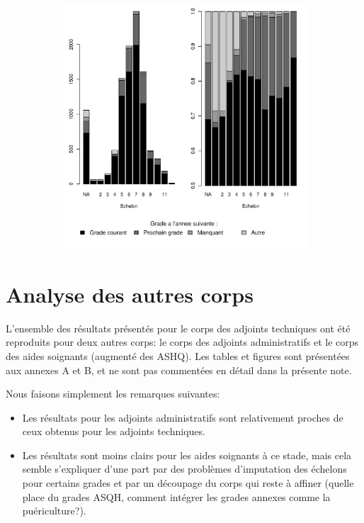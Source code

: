 \documentclass[11pt,a4paper]{article}
\begin{document}
\begin{figure}[ht]
\begin{subfigure}[b]{0.5\linewidth}
    \label{evo_by_ech_794} 
    \centering
    \includegraphics[width=1\linewidth]{AT_hazard_by_ech_794.pdf} 
  \end{subfigure} 
\end{figure}


\section{Analyse des autres corps}

L'ensemble des résultats présentés pour le corps des adjoints techniques ont été reproduits pour deux autres corps: le corps des adjoints administratifs et le corps des aides soignants (augmenté des ASHQ). Les tables et figures sont présentées aux annexes A et B, et ne sont pas commentées en détail dans la présente note. 

Nous faisons simplement les remarques suivantes: 
\begin{itemize}[leftmargin=1cm ,parsep=0cm,itemsep=0cm,topsep=0cm] 
\item Les résultats pour les adjoints administratifs sont relativement proches de ceux obtenus pour les adjoints techniques. 
\item Les résultats sont moins clairs pour les aides soignants à ce stade, mais cela semble s'expliquer d'une part par des problèmes d'imputation des échelons pour certains grades et par un découpage du corps qui reste à affiner (quelle place du grades ASQH, comment intégrer les grades annexes comme la puériculture?). 
\end{itemize}
\end{document}
